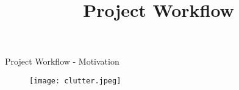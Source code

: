 \documentclass{beamer}
\title[]{Project Workflow}
\date{}
\begin{document}
\maketitle

\beamertemplatenavigationsymbolsempty
\begin{frame}{Project Workflow - Motivation}
    \begin{figure}
        \texttt{[image: clutter.jpeg]}
    \end{figure}      
\end{frame}
\end{document}
